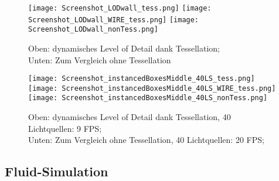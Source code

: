 \begin{figure}[!h]
	\texttt{[image: Screenshot\_LODwall\_tess.png]} 
	\texttt{[image: Screenshot\_LODwall\_WIRE\_tess.png]}
	\texttt{[image: Screenshot\_LODwall\_nonTess.png]} 

	\caption{
		Oben: dynamisches Level of Detail dank Tessellation;\\
	 	Unten: Zum Vergleich ohne Tessellation
	}
	\label{fig:LODwall}
\end{figure}

\begin{figure}[!h]

	\texttt{[image: Screenshot\_instancedBoxesMiddle\_40LS\_tess.png]} 
	\texttt{[image: Screenshot\_instancedBoxesMiddle\_40LS\_WIRE\_tess.png]}
	\texttt{[image: Screenshot\_instancedBoxesMiddle\_40LS\_nonTess.png]} 

	\caption{ 
		Oben: dynamisches Level of Detail dank Tessellation, 40 Lichtquellen: 9 FPS; \\
	 	Unten: Zum Vergleich ohne Tessellation, 40 Lichtquellen: 20 FPS; 
	}
	\label{fig:instancedBoxesMiddle}
\end{figure}


\subsection{Fluid-Simulation}

